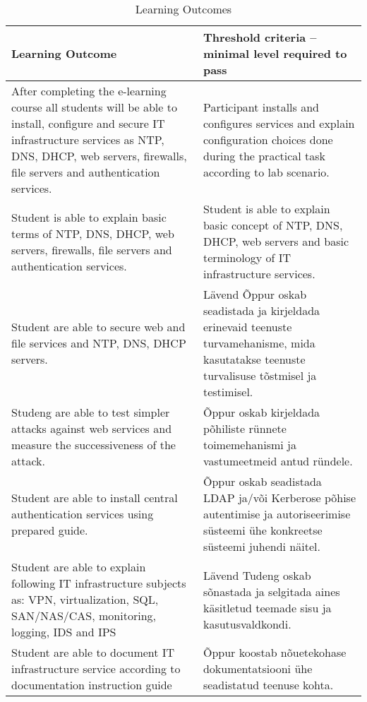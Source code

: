 \begin{table}[h]
\centering
\caption{Learning Outcomes}
\begin{tabular}{|p{7cm}|p{7cm}|}

\hline 
\color{blue} Learning Outcome &\color{blue}  Threshold criteria -- minimal level required to pass \\ 
\hline 
\hline 
After completing the e-learning course all students will be able to install, configure and secure  IT infrastructure services as \gls{NTP}, \gls{DNS}, \gls{DHCP}, web servers, firewalls, file servers and authentication services. & Participant installs and configures services and explain configuration choices done during the practical task according to lab scenario.\\ 
\hline 
Student is able to explain basic terms of \gls{NTP}, \gls{DNS}, \gls{DHCP}, web servers, firewalls, file servers and authentication services. 
& 

Student is able to explain basic concept of \gls{NTP}, \gls{DNS}, \gls{DHCP}, web servers and  basic terminology of IT infrastructure services.
\\ 
\hline 
Student are able to secure web and file services and \gls{NTP}, \gls{DNS}, \gls{DHCP} servers.

& Lävend Õppur oskab seadistada ja kirjeldada erinevaid teenuste
        turvamehanisme, mida kasutatakse teenuste turvalisuse
       tõstmisel ja testimisel. \\ 
\hline 
Studeng are able to test simpler attacks against web services and measure the successiveness of the attack.

& Õppur oskab kirjeldada põhiliste rünnete toimemehanismi ja
vastumeetmeid antud ründele. \\ 
\hline 
Student are able to install central authentication services using prepared guide.
& 
Õppur oskab seadistada LDAP ja/või Kerberose põhise autentimise
ja autoriseerimise süsteemi ühe konkreetse süsteemi juhendi
näitel. 
\\ 
\hline 
Student are able to explain following IT infrastructure subjects as: VPN, virtualization, SQL, SAN/NAS/CAS, monitoring, logging, IDS and IPS
& 
Lävend
Tudeng oskab sõnastada ja selgitada aines käsitletud teemade
sisu ja kasutusvaldkondi. \\ 

\hline 
Student are able to document IT infrastructure service according to documentation instruction guide

& 

Õppur koostab nõuetekohase dokumentatsiooni ühe seadistatud
teenuse kohta. 
\\ 
\hline 

\end{tabular} 
\label{tab:learning_outcomes}
\end{table}

